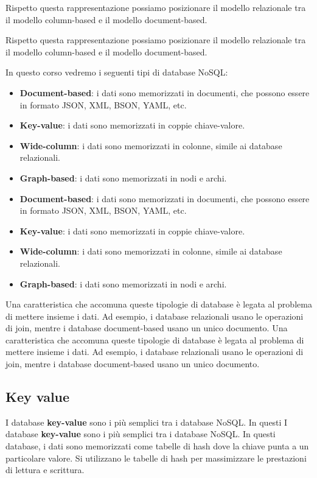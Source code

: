Rispetto questa rappresentazione possiamo posizionare il modello relazionale tra
il modello column-based e il modello document-based.


Rispetto questa rappresentazione possiamo posizionare il modello relazionale tra
il modello column-based e il modello document-based.

In questo corso vedremo i seguenti tipi di database NoSQL:
\begin{itemize}
      \item \textbf{Document-based}: i dati sono memorizzati in documenti, che
            possono essere in formato JSON, XML, BSON, YAML, etc.
      \item \textbf{Key-value}: i dati sono memorizzati in coppie chiave-valore.
      \item \textbf{Wide-column}: i dati sono memorizzati in colonne, simile ai
            database relazionali.
      \item \textbf{Graph-based}: i dati sono memorizzati in nodi e archi.
      \item \textbf{Document-based}: i dati sono memorizzati in documenti, che
            possono essere in formato JSON, XML, BSON, YAML, etc.
      \item \textbf{Key-value}: i dati sono memorizzati in coppie chiave-valore.
      \item \textbf{Wide-column}: i dati sono memorizzati in colonne, simile ai
            database relazionali.
      \item \textbf{Graph-based}: i dati sono memorizzati in nodi e archi.
\end{itemize}
Una caratteristica che accomuna queste tipologie di database è legata al problema
di mettere insieme i dati. Ad esempio, i database relazionali usano le operazioni
di join, mentre i database document-based usano un unico documento.
Una caratteristica che accomuna queste tipologie di database è legata al problema
di mettere insieme i dati. Ad esempio, i database relazionali usano le operazioni
di join, mentre i database document-based usano un unico documento.
\subsection{Key value}
I database \textbf{key-value} sono i più semplici tra i database NoSQL. In questi
I database \textbf{key-value} sono i più semplici tra i database NoSQL. In questi
database, i dati sono memorizzati come tabelle di hash dove la chiave punta a un
particolare valore. Si utilizzano le tabelle di hash per massimizzare le prestazioni
di lettura e scrittura.
